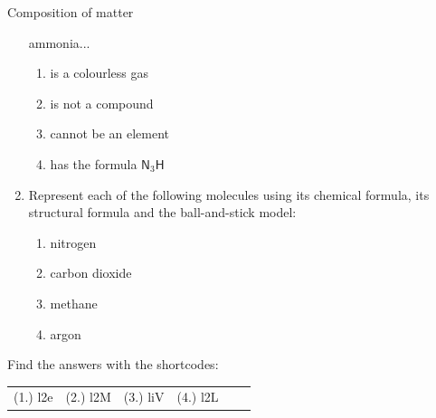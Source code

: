 \begin{eocexercises}{Composition of matter}
\begin{enumerate}[noitemsep, label=\textbf{\arabic*}. ]
ammonia...
\label{m38120*id311590}\begin{enumerate}[noitemsep, label=\textbf{\alph*}. ] 
            \label{m38120*uid94}\item is a 
colourless gas
\label{m38120*uid95}\item is not a compound
\label{m38120*uid96}\item cannot be an element
\label{m38120*uid97}\item has the formula ${\mathsf{N}}_{3}\mathsf{H}$
\end{enumerate}
        \item Represent each of the following molecules using its chemical formula, its structural formula and the ball-and-stick model:
\label{m38120*id524}\begin{enumerate}[noitemsep, label=\textbf{\alph*}. ] 
            \item nitrogen\item carbon dioxide\item methane\item argon\end{enumerate}
\end{enumerate}
  \label{m38120**end}
\par {} Find the answers with the shortcodes:
 \par \begin{tabular}[h]{cccccc}
 (1.) l2e  &  (2.) l2M  &  (3.) liV  &  (4.) l2L  & \end{tabular}
\end{eocexercises}
